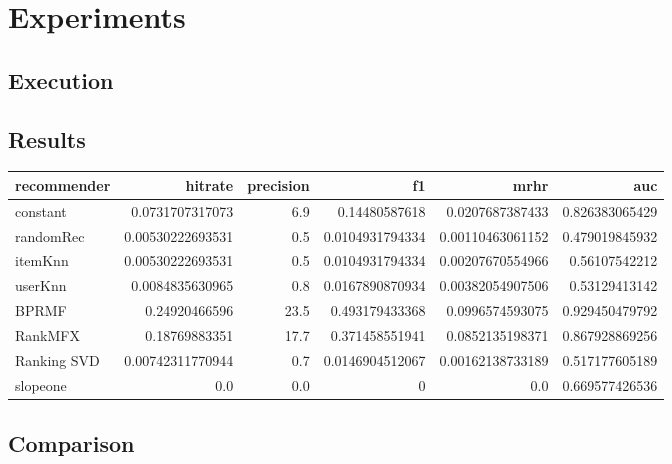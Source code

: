 
\chapter{Experiments}
\label{experiments}


\section{Execution}


\section{Results}
\begin{tabular}{lrrrrr} \toprule
    recommender  & hitrate & precision & f1 & mrhr & auc \\ \midrule
    constant & 0.0731707317073 & 6.9 & 0.14480587618 & 0.0207687387433 & 0.826383065429 \\
    randomRec & 0.00530222693531 & 0.5 & 0.0104931794334 & 0.00110463061152 & 0.479019845932 \\
    itemKnn & 0.00530222693531 & 0.5 & 0.0104931794334 & 0.00207670554966 & 0.56107542212 \\
    userKnn & 0.0084835630965 & 0.8 & 0.0167890870934 & 0.00382054907506 & 0.53129413142 \\
    BPRMF& 0.24920466596 & 23.5 & 0.493179433368 & 0.0996574593075 & 0.929450479792 \\
    RankMFX & 0.18769883351 & 17.7 & 0.371458551941 & 0.0852135198371 & 0.867928869256 \\
    Ranking SVD & 0.00742311770944 & 0.7 & 0.0146904512067 & 0.00162138733189 & 0.517177605189 \\
    slopeone & 0.0 & 0.0 & 0 & 0.0 & 0.669577426536 \\ \bottomrule
\end{tabular}

\section{Comparison}


